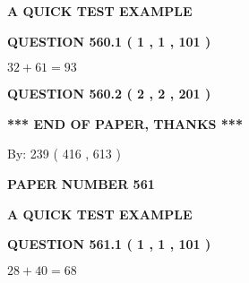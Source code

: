 \documentclass[12pt]{article}
\begin{document}
   
   
   
   
   
 \vspace{0.2in}
{\LARGE {\textbf{ A QUICK TEST EXAMPLE}}}
   
   
  
\vspace{0.2in}
  
{\textbf{\Large{QUESTION
560.1 
 ( 1 , 1 , 101 )
}}}
  
  
 
 

$ %
32 +  %
61=   %
93$
 
 
  
\vspace{0.2in}
  
{\textbf{\Large{QUESTION
560.2 
 ( 2 , 2 , 201 )
}}}
  
  
   
   
 \vspace{0.2in}
 
   
   
   
   
\vspace{1.0in} 
{\textbf{\large{ *** END OF PAPER, THANKS *** }}} 
   
   
\hspace{1.0in} By: 
 239 ( 416 ,  613 )
   
   
   
   
\newpage 
\setcounter{page}{ 
   561001 } 
   
   
   
   
 {\textbf{ \Large{ PAPER NUMBER  561  }}}
   
   
\vspace{0.2in}
   
   
   
   
   
   
 \vspace{0.2in}
{\LARGE {\textbf{ A QUICK TEST EXAMPLE}}}
   
   
  
\vspace{0.2in}
  
{\textbf{\Large{QUESTION
561.1 
 ( 1 , 1 , 101 )
}}}
  
  
 
 

$ %
28 +  %
40=   %
68$
 
\end{document}

